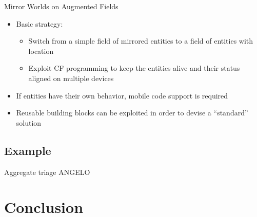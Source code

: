 \documentclass[presentation]{beamer} %
\begin{document}
\begin{frame}{Mirror Worlds on Augmented Fields}
  \begin{block}{}
    \begin{itemize}
      \item Basic strategy: 
      \begin{itemize}
        \item Switch from a simple field of mirrored entities to a field of entities with location
        \item Exploit CF programming to keep the entities alive and their status aligned on multiple devices
      \end{itemize}
      \item If entities have their own behavior, mobile code support is required \cite{computationalfields-forte2015}
      \item Reusable building blocks can be exploited in order to devise a ``standard'' solution \cite{IoT2015}
    \end{itemize}
  \end{block}
\end{frame}

\subsection{Example}
\begin{frame}{Aggregate triage}
ANGELO
\end{frame}

\section{Conclusion}
\end{document}
